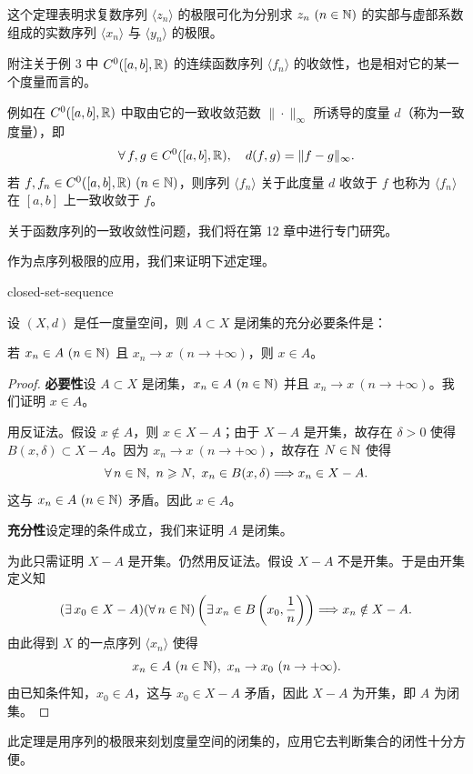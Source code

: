 这个定理表明求复数序列 $\langle z_n\rangle$ 的极限可化为分别求 $z_n\ (n\in\mathbb{N})$ 的实部与虚部系数组成的实数序列 $\langle x_n\rangle$ 与 $\langle y_n\rangle$ 的极限。

附注\quad 关于例 3 中 $C^0([a,b],\mathbb{R})$ 的连续函数序列 $\langle f_n\rangle$ 的收敛性，也是相对它的某一个度量而言的。

例如在 $C^0([a,b],\mathbb{R})$ 中取由它的一致收敛范数 $\|\cdot\|_{\infty}$ 所诱导的度量 $d$（称为一致度量），即
\[\forall\,f,g\in C^0([a,b],\mathbb{R}),\quad d(f,g)=\|f-g\|_{\infty}.\]
若 $f,f_n\in C^0([a,b],\mathbb{R})\ (n\in\mathbb{N})$，则序列 $\langle f_n\rangle$ 关于此度量 $d$ 收敛于 $f$ 也称为 $\langle f_n\rangle$ 在 $[a,b]$ 上一致收敛于 $f$。

关于函数序列的一致收敛性问题，我们将在第 12 章中进行专门研究。

作为点序列极限的应用，我们来证明下述定理。

\begin{mythm}{}{closed-set-sequence}

设 $(X,d)$ 是任一度量空间，则 $A\subset X$ 是闭集的充分必要条件是：

若 $x_n\in A\ (n\in\mathbb{N})$ 且 $x_n\to x\ (n\to+\infty)$，则 $x\in A$。

\end{mythm}

\begin{proof}

\textbf{必要性}\quad 设 $A\subset X$ 是闭集，$x_n\in A\ (n\in\mathbb{N})$ 并且 $x_n\to x\ (n\to+\infty)$。我们证明 $x\in A$。

用反证法。假设 $x\notin A$，则 $x\in X-A$；由于 $X-A$ 是开集，故存在 $\delta>0$ 使得 $B(x,\delta)\subset X-A$。因为 $x_n\to x\ (n\to+\infty)$，故存在 $N\in\mathbb{N}$ 使得
\[\forall\,n\in\mathbb{N},\ n\geqslant N,\ x_n\in B(x,\delta)\Longrightarrow x_n\in X-A.\]
这与 $x_n\in A\ (n\in\mathbb{N})$ 矛盾。因此 $x\in A$。

\textbf{充分性}\quad 设定理的条件成立，我们来证明 $A$ 是闭集。

为此只需证明 $X-A$ 是开集。仍然用反证法。假设 $X-A$ 不是开集。于是由开集定义知
\[(\exists\,x_0\in X-A)(\forall\,n\in\mathbb{N})\left(\exists\,x_n\in B\left(x_0,\frac{1}{n}\right)\right)\Longrightarrow x_n\notin X-A.\]
由此得到 $X$ 的一点序列 $\langle x_n\rangle$ 使得
\[x_n\in A\ (n\in\N),\ x_n\to x_0\ (n\to+\infty).\]
由已知条件知，$x_0\in A$，这与 $x_0\in X-A$ 矛盾，因此 $X-A$ 为开集，即 $A$ 为闭集。

\end{proof}

此定理是用序列的极限来刻划度量空间的闭集的，应用它去判断集合的闭性十分方便。

